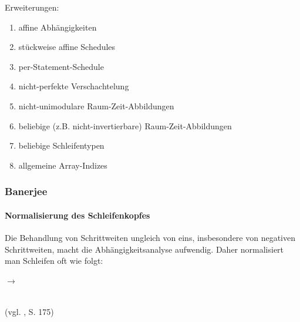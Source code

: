 Erweiterungen:
\begin{enumerate}
\item affine Abhängigkeiten\\[-7mm]
\item stückweise affine Schedules\\[-7mm]
\item per-Statement-Schedule\\[-7mm]
\item nicht-perfekte Verschachtelung\\[-7mm]
\item nicht-unimodulare Raum-Zeit-Abbildungen\\[-7mm]
\item beliebige (z.B. nicht-invertierbare) Raum-Zeit-Abbildungen\\[-7mm]
\item beliebige Schleifentypen\\[-7mm]
\item allgemeine Array-Indizes\\[-7mm]
\end{enumerate}


\subsubsection{Banerjee}

\paragraph{Normalisierung des Schleifenkopfes}

Die Behandlung von Schrittweiten ungleich von eins, insbesondere von
negativen Schrittweiten, macht die Abhängigkeitsanalyse aufwendig. Daher
normalisiert man Schleifen oft wie folgt:



 
\begin{minipage}{.4\textwidth}
  \begin{algorithm}[H]
  \end{algorithm}
\end{minipage}
\begin{minipage}{.5\textwidth}
    \qquad $\to$ \qquad  
    \begin{algorithm}[H]
      \end{algorithm}  
\end{minipage}
  ~\\
(vgl. \cite{Zima90}, S. 175)

